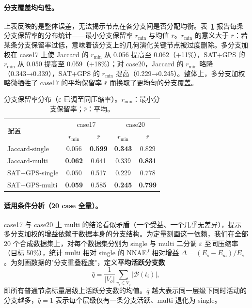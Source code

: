 \documentclass[twocolumn, a4paper, 10pt]{article}
\begin{document}
\paragraph{分支覆盖均匀性。}上表反映的是整体误差，无法揭示节点在各分支间是否分配均衡。表~\ref{tab:branch-coverage} 报告每条分支保留率的分布统计——最小分支保留率 $r_{\min}$ 与均值 $\bar{r}$。$r_{\min}$ 的意义大于 $\bar{r}$：若某条分支保留率过低，意味着该分支上的几何演化关键节点被过度删除。多分支加权在 case17 上使 Jaccard 的 $r_{\min}$ 从 0.056 提高至 0.062（+11\%），SAT+GPS 的 $r_{\min}$ 从 0.050 提高至 0.059（+18\%）；对 case20，Jaccard 的 $r_{\min}$ 略降（0.343→0.339），SAT+GPS 的 $r_{\min}$ 提高（0.229→0.245）。整体上，多分支加权略微牺牲了 case17 的平均保留率 $\bar{r}$ 而换取了更均匀的分支覆盖。

\begin{table}[h]
\centering
\small
\caption{分支保留率分布（$\varepsilon$ 已调至同压缩率）。$r_{\min}$：最小分支保留率；$\bar{r}$：平均。}
\label{tab:branch-coverage}
\begin{tabular}{lcccc}
\hline
\multirow{2}{*}{配置} & \multicolumn{2}{c}{case17} & \multicolumn{2}{c}{case20} \\
                     & $r_{\min}$ & $\bar{r}$ & $r_{\min}$ & $\bar{r}$ \\
\hline
Jaccard-single    & 0.056 & \textbf{0.599} & \textbf{0.343} & 0.829 \\
Jaccard-multi     & \textbf{0.062} & 0.641 & 0.339 & \textbf{0.831} \\
SAT+GPS-single        & 0.050 & 0.517 & 0.229 & 0.778 \\
SAT+GPS-multi         & \textbf{0.059} & 0.585 & \textbf{0.245} & \textbf{0.799} \\
\hline
\end{tabular}
\end{table}

\paragraph{适用条件分析（20 case 全量）。}case17 与 case20 上 multi 的结论看似矛盾（一个受益、一个几乎无差异），提示多分支加权的增益依赖于数据本身的分支结构。为定量刻画这一依赖，我们在全部 20 个合成数据集上，对每个数据集分别为 single 与 multi 二分调 $\varepsilon$ 至同压缩率（目标 50\%），统计 multi 相对 single 的 NNAE$^J$ 相对增益 $\Delta = (E_s - E_m) / E_s$。为刻画数据的"分支重叠程度"，定义\textbf{平均活跃分支数}
\begin{equation}
\bar{q} = \frac{1}{|V_o|} \sum_{v_i \in V_o} |\mathcal{B}(t_i)|,
\label{eq:qbar}
\end{equation}
即所有普通节点标量层级上活跃分支数的均值。$\bar{q}$ 越大表示同一层级下同时活动的分支越多，$\bar{q}=1$ 表示每个层级仅有一条分支活跃、multi 退化为 single。
\end{document}
